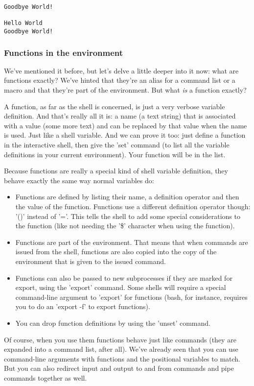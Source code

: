 \scriptsize
\begin{verbatim}
Goodbye World!

Hello World
Goodbye World!
\end{verbatim}
\normalsize

\subsubsection{Functions in the environment}
We've mentioned it before, but let's delve a little deeper into it now: what
are functions exactly? We've hinted that they're an alias for a command list or
a macro and that they're part of the environment. But what \emph{is} a function
exactly?

A function, as far as the shell is concerned, is just a very verbose variable
definition. And that's really all it is: a name (a text string) that is
associated with a value (some more text) and can be replaced by that value when
the name is used. Just like a shell variable. And we can prove it too: just
define a function in the interactive shell, then give the 'set' command (to
list all the variable definitions in your current environment). Your function
will be in the list.

Because functions are really a special kind of shell variable definition, they
behave exactly the same way normal variables do:

\begin{itemize}
\setlength{\leftmargin}{0pt}
\setlength{\itemsep}{0pt}
\setlength{\parsep}{0pt}
\setlength{\parskip}{0pt}
	\item Functions are defined by listing their name, a definition operator
and then the value of the function. Functions use a different definition
operator though: '()' instead of '='. This tells the shell to add some special
considerations to the function (like not needing the '\$' character when using
the function).
	\item Functions are part of the environment. That means that when commands
are issued from the shell, functions are also copied into the copy of the
environment that is given to the issued command.
	\item Functions can also be passed to new subprocesses if they are marked
for export, using the 'export' command. Some shells will require a special
command-line argument to 'export' for functions (bash, for instance, requires
you to do an 'export -f' to export functions).
	\item You can drop function definitions by using the 'unset' command.
\end{itemize}

Of course, when you use them functions behave just like commands (they are
expanded into a command list, after all). We've already seen that you can use
command-line arguments with functions and the positional variables to match.
But you can also redirect input and output to and from commands and pipe
commands together as well.
